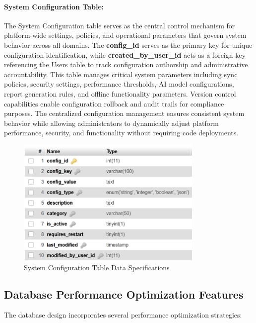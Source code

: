 \documentclass[12pt,a4paper,oneside]{book}
\begin{document}
\paragraph{System Configuration Table:}
The System Configuration table serves as the central control mechanism for platform-wide settings, policies, and operational parameters that govern system behavior across all domains. The \textbf{config\_id} serves as the primary key for unique configuration identification, while \textbf{created\_by\_user\_id} acts as a foreign key referencing the Users table to track configuration authorship and administrative accountability. This table manages critical system parameters including sync policies, security settings, performance thresholds, AI model configurations, report generation rules, and offline functionality parameters. Version control capabilities enable configuration rollback and audit trails for compliance purposes. The centralized configuration management ensures consistent system behavior while allowing administrators to dynamically adjust platform performance, security, and functionality without requiring code deployments.

\begin{figure}[H]
\centering
\includegraphics[width=0.8\textwidth]{assets/DBTable/Table4.13.png}
\caption{System Configuration Table Data Specifications}
\label{table:system_configuration}
\end{figure}

\vspace{1cm}
\subsection{Database Performance Optimization Features}

The database design incorporates several performance optimization strategies:
\end{document}
